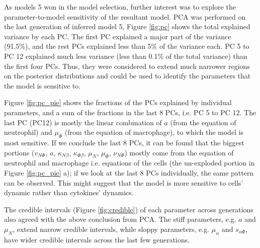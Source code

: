 As models 5 won in the model selection, further interest was to explore the parameter-to-model sensitivity of the resultant model. PCA was performed on the last generation of inferred model 5, Figure \ref{fig:pc} shows the total explained variance by each PC. The first PC explained a major part of the variance (91.5\%), and the rest PCs explained less than 5\% of the variance each. PC 5 to PC 12 explained much less variance (less than 0.1\% of the total variance) than the first four PCs. Thus, they were considered to extend much narrower regions on the posterior distributions and could be used to identify the parameters that the model is sensitive to.

Figure \ref{fig:pc_pie} shows the fractions of the PCs explained by individual parameters, and a sum of the fractions in the last 8 PCs, i.e. PC 5 to PC 12. The last PC (PC12) is mostly the linear combination of $a$ (from the equation of neutrophil) and $\mu_\Phi$ (from the equation of macrophage), to which the model is most sensitive. If we conclude the last 8 PCs, it can be found that the biggest portions ($v_{N\Phi}$, $a$, $\kappa_{N\beta}$, $\kappa_{\Phi\beta}$, $\mu_N$, $\mu_\Phi$, $\nu_{N\Phi}$) mostly come from the equation of neutrophil and macrophage i.e. equations of the cells (the un-exploded portion in Figure \ref{fig:pc_pie} a); if we look at the last 8 PCs individually, the same pattern can be observed. This might suggest that the model is more sensitive to cells' dynamic rather than cytokines' dynamics.

The credible intervals (Figure \ref{fig:credible}) of each parameter across generations also agreed with the above conclusion from PCA. The stiff parameters, e.g. $a$ and $\mu_N$, extend narrow credible intervals, while sloppy parameters, e.g. $\mu_\alpha$ and $s_{\alpha\Phi}$, have wider credible intervals across the last few generations.


